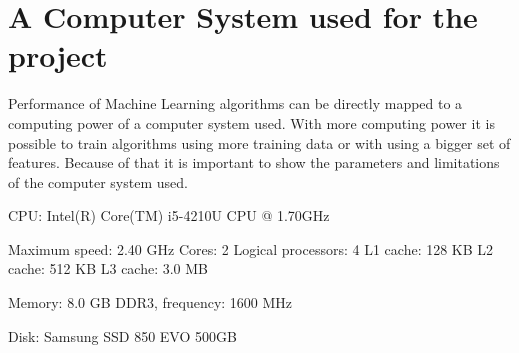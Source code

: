\chapter{A Computer System used for the project}

Performance of Machine Learning algorithms can be directly mapped to a computing power of a computer system used. With more computing power it is possible to train algorithms using more training data or with using a bigger set of features. Because of that it is important to show the parameters and limitations of the computer system used.

CPU: Intel(R) Core(TM) i5-4210U CPU @ 1.70GHz

	Maximum speed:	2.40 GHz
	Cores:	2
	Logical processors:	4
	L1 cache:	128 KB
	L2 cache:	512 KB
	L3 cache:	3.0 MB


Memory: 8.0 GB DDR3, frequency:	1600 MHz

Disk: Samsung SSD 850 EVO 500GB

